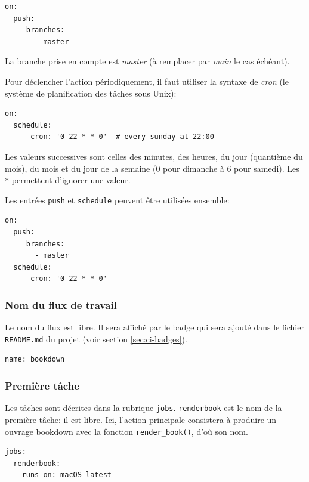 \documentclass[
  12pt,
  french,
  a4paper,
  extrafontsizes,onecolumn,openright
  ]{memoir}
\begin{document}
\begin{verbatim}
on:
  push:
     branches:
       - master
\end{verbatim}

La branche prise en compte est \emph{master} (à remplacer par \emph{main} le cas échéant).

Pour déclencher l'action périodiquement, il faut utiliser la syntaxe de \emph{cron} (le système de planification des tâches sous Unix):

\begin{verbatim}
on:
  schedule:
    - cron: '0 22 * * 0'  # every sunday at 22:00
\end{verbatim}

Les valeurs successives sont celles des minutes, des heures, du jour (quantième du mois), du mois et du jour de la semaine (0 pour dimanche à 6 pour samedi).
Les \texttt{*} permettent d'ignorer une valeur.

Les entrées \texttt{push} et \texttt{schedule} peuvent être utilisées ensemble:

\begin{verbatim}
on:
  push:
     branches:
       - master
  schedule:
    - cron: '0 22 * * 0'
\end{verbatim}

\hypertarget{nom-du-flux-de-travail}{%
\subsubsection{Nom du flux de travail}\label{nom-du-flux-de-travail}}

Le nom du flux est libre.
Il sera affiché par le badge qui sera ajouté dans le fichier \texttt{README.md} du projet (voir section \ref{sec:ci-badges}).

\begin{verbatim}
name: bookdown
\end{verbatim}

\hypertarget{premiuxe8re-tuxe2che}{%
\subsubsection{Première tâche}\label{premiuxe8re-tuxe2che}}

Les tâches sont décrites dans la rubrique \texttt{jobs}.
\texttt{renderbook} est le nom de la première tâche: il est libre.
Ici, l'action principale consistera à produire un ouvrage bookdown avec la fonction \texttt{render\_book()}, d'où son nom.

\begin{verbatim}
jobs:
  renderbook:
    runs-on: macOS-latest
\end{verbatim}
\end{document}
